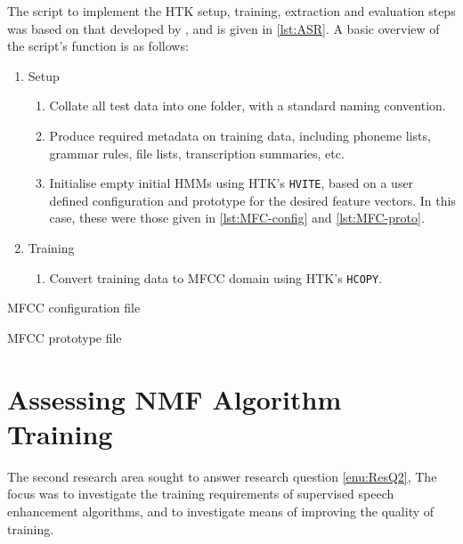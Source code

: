 The script to implement the \ac{HTK} setup, training, extraction
and evaluation steps was based on that developed by \citet{Quill2014},
and is given in \ref{lst:ASR}. A basic overview of the script's function
is as follows:
\begin{enumerate}
\item Setup

\begin{enumerate}
\item Collate all test data into one folder, with a standard naming convention.
\item Produce required metadata on training data, including phoneme lists,
grammar rules, file lists, transcription summaries, etc.
\item Initialise empty initial \acp{HMM} using \ac{HTK}'s \lstinline[language=bash]!HVITE!,
based on a user defined configuration and prototype for the desired
feature vectors. In this case, these were those given in \ref{lst:MFC-config}
and \ref{lst:MFC-proto}.
\end{enumerate}
\item Training

\begin{enumerate}
\item Convert training data to \ac{MFCC} domain using \ac{HTK}'s \lstinline[language=bash]!HCOPY!.
\end{enumerate}
\end{enumerate}
\begin{listing}[H]
\protect\caption{\acl{MFCC} configuration file\label{lst:MFC-config}}



\end{listing}


\begin{listing}[H]
\protect\caption{\acl{MFCC} prototype file\label{lst:MFC-proto}}



\end{listing}



\section{Assessing \acl{NMF} Algorithm Training}

The second research area sought to answer research question \ref{enu:ResQ2},
\textit{\RQtwo{}} The focus was to investigate the training requirements
of supervised speech enhancement algorithms, and to investigate means
of improving the quality of training.


